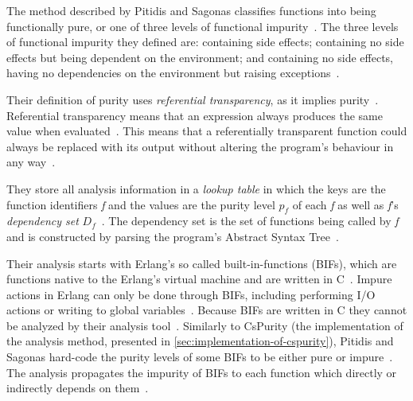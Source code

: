 \documentclass[a4paper,12pt]{article}
\begin{document}
The method described by Pitidis and Sagonas classifies functions into being functionally pure, or one of three levels of functional impurity~\cite{pitidis2010purity}. The three levels of functional impurity they defined are: containing side effects; containing no side effects but being dependent on the environment; and containing no side effects, having no dependencies on the environment but raising exceptions~\cite{pitidis2010purity}.

Their definition of purity uses \textit{referential transparency}, as it implies purity~\cite{pitidis2010purity}. Referential transparency means that an expression always produces the same value when evaluated~\cite{pitidis2010purity}. This means that a referentially transparent function could always be replaced with its output without altering the program's behaviour in any way~\cite{pitidis2010purity}.

They store all analysis information in a \textit{lookup table} in which the keys are the function identifiers \textit{f} and the values are the purity level \textit{$p_f$} of each \textit{f} as well as \textit{f}'s \textit{dependency set} $D_f$~\cite{pitidis2010purity}. The dependency set is the set of functions being called by \textit{f} and is constructed by parsing the program's Abstract Syntax Tree~\cite{pitidis2010purity}.

Their analysis starts with Erlang's so called built-in-functions (BIFs), which are functions native to the Erlang's virtual machine and are written in C~\cite{pitidis2010purity}. Impure actions in Erlang can only be done through BIFs, including performing I/O actions or writing to global variables~\cite{kostis-email}. Because BIFs are written in C they cannot be analyzed by their analysis tool~\cite{pitidis2010purity}. Similarly to CsPurity (the implementation of the analysis method, presented in \autoref{sec:implementation-of-cspurity}), Pitidis and Sagonas hard-code the purity levels of some BIFs to be either pure or impure~\cite{pitidis2010purity}. The analysis propagates the impurity of BIFs to each function which directly or indirectly depends on them~\cite{pitidis2010purity}.
\end{document}
